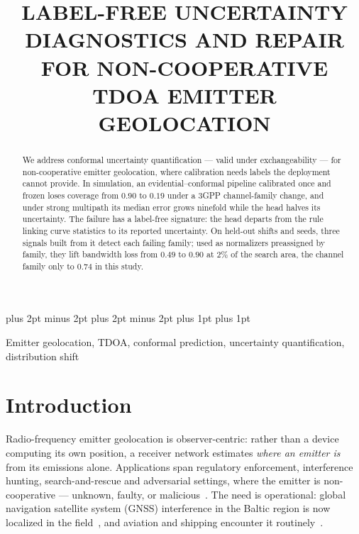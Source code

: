 \documentclass{article}
\title{LABEL-FREE UNCERTAINTY DIAGNOSTICS AND REPAIR FOR
       NON-COOPERATIVE TDOA EMITTER GEOLOCATION}
\begin{document}
\ninept
\makeatletter\renewcommand\footnotesize{\@setfontsize\footnotesize\@ixpt{10.5}}\makeatother
\maketitle
\abovedisplayskip=4pt plus 2pt minus 2pt
\belowdisplayskip=4pt plus 2pt minus 2pt
\abovedisplayshortskip=2pt plus 1pt
\belowdisplayshortskip=2pt plus 1pt
\renewcommand{\arraystretch}{0.95}

\begin{abstract}
We address conformal uncertainty quantification --- valid under
exchangeability --- for non-cooperative emitter geolocation, where
calibration needs labels the deployment cannot provide. In simulation, an evidential--conformal pipeline calibrated once and frozen
loses coverage from $0.90$ to $0.19$ under a 3GPP channel-family change,
and under strong multipath its median error grows ninefold while the head
halves its uncertainty. The failure has a label-free signature: the head
departs from the rule linking curve statistics to its reported uncertainty.
On held-out shifts and seeds, three signals built from it detect each
failing family; used as normalizers preassigned by family, they lift
bandwidth loss from $0.49$ to $0.90$ at $2\%$ of the search area, the
channel family only to $0.74$ in this study.
\end{abstract}

\begin{keywords}
Emitter geolocation, TDOA, conformal prediction, uncertainty
quantification, distribution shift
\end{keywords}

\section{Introduction}
\label{sec:intro}

Radio-frequency emitter geolocation is observer-centric: rather than a
device computing its own position, a receiver network estimates \emph{where
an emitter is} from its emissions alone. Applications span regulatory
enforcement, interference hunting, search-and-rescue and adversarial
settings, where the emitter is non-cooperative --- unknown, faulty, or
malicious~\cite{npj2026}. The need is operational: global navigation satellite system
(GNSS) interference in the Baltic
region is now localized in the field~\cite{gattis2026}, and
aviation and shipping encounter it
routinely~\cite{clements2023}.
\end{document}

